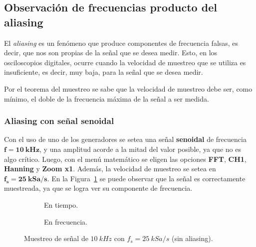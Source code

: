  \pagebreak
  \subsection{Observación de frecuencias producto del aliasing}
    El \textit{aliasing} es un fenómeno que produce componentes de frecuencia falsas, es decir,
    que nos son propias de la señal que se desea medir. Esto, en los osciloscopios digitales,
    ocurre cuando la velocidad de muestreo que se utiliza es insuficiente, es decir, muy baja,
    para la señal que se desea medir.
    
    Por el teorema del muestreo se sabe que la velocidad de muestreo debe ser, como mínimo, el
    doble de la frecuencia máxima de la señal a ser medida.

    \subsubsection{Aliasing con señal senoidal}
      Con el uso de uno de los generadores se setea una señal \textbf{senoidal} de frecuencia
      $\mathbf{f = 10~kHz}$, y una amplitud acorde a la mitad del valor posible, ya que no es
      algo crítico. Luego, con el menú matemático se eligen las opciones \textbf{FFT}, \textbf{CH1},
      \textbf{Hanning} y \textbf{Zoom x1}. Además, la velocidad de muestreo se setea en 
      $\mathbf{f_s = 25~kSa/s}$. En la Figura~\ref{fig:Exp3Señal10k} se puede observar que la señal 
      es correctamente muestreada, ya que se logra ver su componente de frecuencia.
      
      \begin{figure}[H]
        \centering
        \begin{subfigure}[H]{0.40\textwidth}
          \caption{En tiempo.}
        \end{subfigure}
        \hfill
        \begin{subfigure}[H]{0.41\textwidth}
          \caption{En frecuencia.}
        \end{subfigure}

        \caption{Muestreo de señal de $10~kHz$ con $f_s=25~kSa/s$ (sin aliasing).}
        \label{fig:Exp3Señal10k}
      \end{figure}
      
